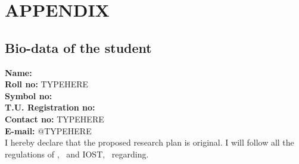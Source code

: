 \chapter*{APPENDIX}

\section*{Bio-data of the student}

\textbf{Name: } \myname
\\
\textbf{Roll no: } TYPEHERE
\\
\textbf{Symbol no: } \sym
\\
\textbf{T.U. Registration no: } \reg
\\
\textbf{Contact no: } TYPEHERE
\\
\textbf{E-mail: } @TYPEHERE
\\

\hspace{1cm} I \textbf{\myname} hereby declare that the proposed research plan
is original. I will follow all the regulations of \depart, \clz\ and IOST,
\tu\ regarding.







